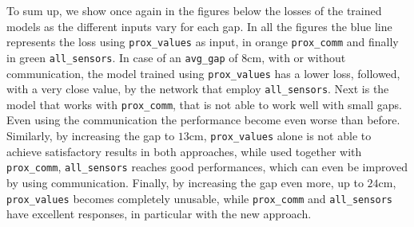 To sum up, we show once again in the figures below the losses of the trained 
models as the different inputs vary for each gap. In all the figures the blue line 
represents the loss using \texttt{prox\_values} as input, in orange 
\texttt{prox\_comm} and finally in green \texttt{all\_sensors}.
In case of an \texttt{avg\_gap} of $8$\gls{cm}, with or without communication, 
the model trained using \texttt{prox\_values} has a lower loss, followed, with a 
very close value, by the network that employ \texttt{all\_sensors}.
Next is the model that works with \texttt{prox\_comm}, that is not able to work 
well with small gaps. Even using the communication the performance become 
even worse than before. 
Similarly, by increasing the gap to $13$\gls{cm}, \texttt{prox\_values} alone is not 
able to achieve satisfactory results in both approaches, while used together with 
\texttt{prox\_comm}, \texttt{all\_sensors} reaches good performances, which can 
even be improved by using communication.
Finally, by increasing the gap even more, up to $24$\gls{cm}, 
\texttt{prox\_values} becomes completely unusable, while \texttt{prox\_comm} 
and \texttt{all\_sensors} have excellent responses, in particular with the new 
approach.

